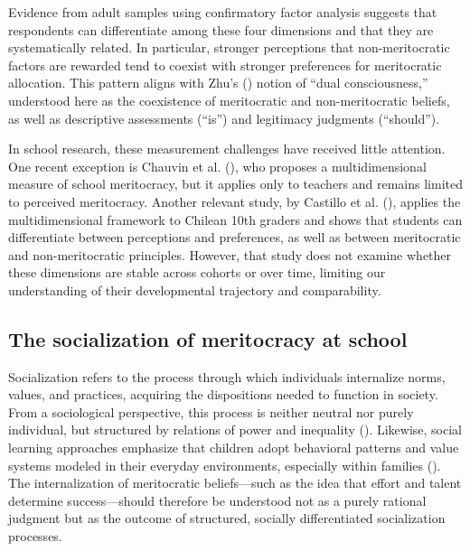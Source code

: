 \documentclass[
  13pt,
]{article}
\begin{document}
Evidence from adult samples using confirmatory factor analysis suggests
that respondents can differentiate among these four dimensions and that
they are systematically related. In particular, stronger perceptions
that non-meritocratic factors are rewarded tend to coexist with stronger
preferences for meritocratic allocation. This pattern aligns with Zhu's
() notion of ``dual
consciousness,'' understood here as the coexistence of meritocratic and
non-meritocratic beliefs, as well as descriptive assessments (``is'')
and legitimacy judgments (``should'').

In school research, these measurement challenges have received little
attention. One recent exception is Chauvin et al.
(), who proposes a
multidimensional measure of school meritocracy, but it applies only to
teachers and remains limited to perceived meritocracy. Another relevant
study, by Castillo et al.
(), applies the
multidimensional framework to Chilean 10th graders and shows that
students can differentiate between perceptions and preferences, as well
as between meritocratic and non-meritocratic principles. However, that
study does not examine whether these dimensions are stable across
cohorts or over time, limiting our understanding of their developmental
trajectory and comparability.

\subsection{The socialization of meritocracy at
school}\label{the-socialization-of-meritocracy-at-school}

Socialization refers to the process through which individuals
internalize norms, values, and practices, acquiring the dispositions
needed to function in society. From a sociological perspective, this
process is neither neutral nor purely individual, but structured by
relations of power and inequality
(). Likewise, social
learning approaches emphasize that children adopt behavioral patterns
and value systems modeled in their everyday environments, especially
within families (). The internalization of meritocratic beliefs---such as the idea
that effort and talent determine success---should therefore be
understood not as a purely rational judgment but as the outcome of
structured, socially differentiated socialization processes.
\end{document}
